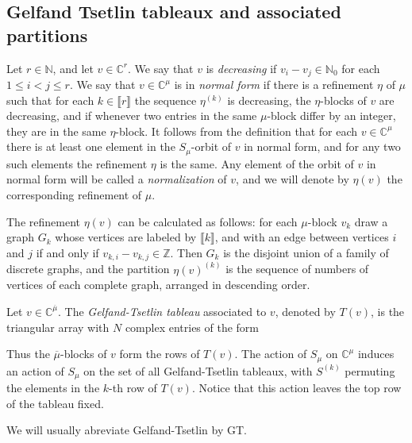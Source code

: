 \documentclass[11pt,fleqn]{article}
\newcommand\NN{\mathbb N}
\newcommand\CC{\mathbb C}
\newcommand\ZZ{\mathbb Z}
\newcommand\interval[1]{\llbracket #1 \rrbracket}
\begin{document}
\subsection{Gelfand Tsetlin tableaux and associated partitions}
Let $r \in \NN$, and let $v \in \CC^r$. We say that $v$ is \emph{decreasing} if
$v_i - v_j \in \NN_0$ for each $1 \leq i < j \leq r$. We say that $v \in 
\CC^\mu$ is in \emph{normal form} if there is a refinement $\eta$ of $\mu$ 
such that for each $k \in \interval r$ the sequence $\eta^{(k)}$ is 
decreasing, the $\eta$-blocks of $v$ are decreasing, and if whenever two 
entries in the same $\mu$-block differ by an integer, they are in the same 
$\eta$-block. It follows from the definition that for each $v \in \CC^\mu$ 
there is at least one element in the $S_\mu$-orbit of $v$ in normal form, and
for any two such elements the refinement $\eta$ is the same. Any element of
the orbit of $v$ in normal form will be called a \emph{normalization} of $v$, 
and we will denote by $\eta(v)$ the corresponding refinement of $\mu$. 

The refinement $\eta(v)$ can be calculated as follows: for each $\mu$-block 
$v_k$ draw a graph $G_k$ whose vertices are labeled by $\interval{k}$, and 
with an edge between vertices $i$ and $j$ if and only if $v_{k,i} - v_{k,j} 
\in \ZZ$. Then $G_k$ is the disjoint union of a family of discrete graphs,
and the partition $\eta(v)^{(k)}$ is the sequence of numbers of vertices of
each complete graph, arranged in descending order. 

\begin{Definition}
Let $v \in \CC^{\overline \mu}$. The \emph{Gelfand-Tsetlin tableau} associated 
to $v$, denoted by $T(v)$, is the triangular array with $N$ complex entries of 
the form


Thus the $\overline \mu$-blocks of $v$ form the rows of $T(v)$. The action of 
$S_\mu$ on $\CC^\mu$ induces an action of $S_\mu$ on the set of all 
Gelfand-Tsetlin tableaux, with $S^{(k)}$ permuting the elements in the $k$-th 
row of $T(v)$. Notice that this action leaves the top row of the tableau fixed.
\end{Definition}
We will usually abreviate Gelfand-Tsetlin by GT.
\end{document}
